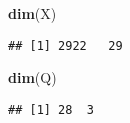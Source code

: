 \documentclass[]{article}
\newenvironment{Shaded}{\begin{snugshade}}{\end{snugshade}}
\newcommand{\KeywordTok}[1]{\textcolor[rgb]{0.13,0.29,0.53}{\textbf{#1}}}
\newcommand{\NormalTok}[1]{#1}
\newcommand{\OperatorTok}[1]{\textcolor[rgb]{0.81,0.36,0.00}{\textbf{#1}}}
\newcommand{\StringTok}[1]{\textcolor[rgb]{0.31,0.60,0.02}{#1}}
\begin{document}
\begin{Shaded}
\begin{Highlighting}[]
\KeywordTok{dim}\NormalTok{(X)}
\end{Highlighting}
\end{Shaded}

\begin{verbatim}
## [1] 2922   29
\end{verbatim}

\begin{Shaded}
\begin{Highlighting}[]
\KeywordTok{dim}\NormalTok{(Q)}
\end{Highlighting}
\end{Shaded}

\begin{verbatim}
## [1] 28  3
\end{verbatim}

\begin{Shaded}
\end{Shaded}
\end{document}
